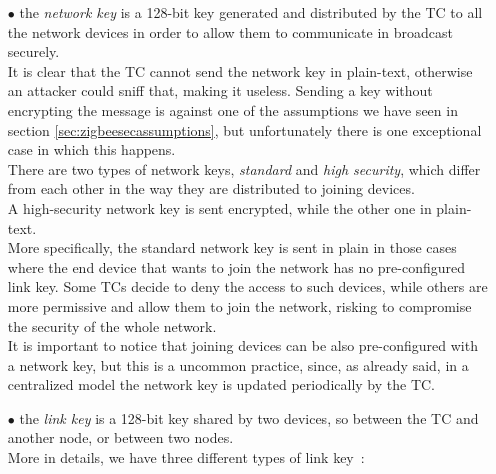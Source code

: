 \documentclass[12pt]{report}
\begin{document}
\begin{itemize}
\setlength{\itemindent}{+4mm}
\item[$\bullet$] the \emph{network key} is a 128-bit key generated and distributed by the TC to all the network devices in order to allow them to communicate in broadcast securely.\\
It is clear that the TC cannot send the network key in plain-text, otherwise an attacker could sniff that, making it useless. Sending a key without encrypting the message is against one of the assumptions we have seen in section \ref{sec:zigbeesecassumptions}, but unfortunately there is one exceptional case in which this happens.\\

There are two types of network keys, \emph{standard} and \emph{high security}, which differ from each other in the way they are distributed to joining devices. \\
A high-security network key is sent encrypted, while the other one in plain-text.\\
More specifically, the standard network key is sent in plain in those cases where the end device that wants to join the network has no pre-configured link key. Some TCs decide to deny the access to such devices, while others are more permissive and allow them to join the network, risking to compromise the security of the whole network.\\

It is important to notice that joining devices can be also pre-configured with a network key, but this is a uncommon practice, since, as already said,  in a centralized model the network key is updated periodically by the TC.
\item[$\bullet$] the \emph{link key} is a 128-bit key shared by two devices, so between the TC and another node, or between two nodes.\\
More in details, we have three different types of link key~\cite{secanalysisofzigbee}:


\end{itemize}
\end{document}
